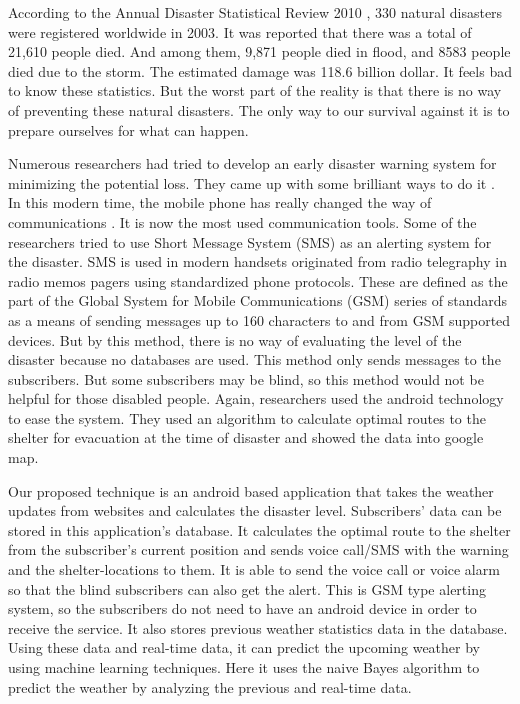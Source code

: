 \documentclass[conference]{IEEEtran}
\begin{document}
    
According to the Annual Disaster Statistical Review 2010 \cite {guha2011annual}, 330 natural disasters were registered worldwide in 2003.  It was reported that there was a total of 21,610 people died. And among them, 9,871 people died in flood, and 8583 people died due to the storm. The estimated damage was 118.6 billion dollar. It feels bad to know these statistics. But the worst part of the reality is that there is no way of preventing these natural disasters. The only way to our survival against it is to prepare ourselves for what can happen.


Numerous researchers had tried to develop an early disaster warning system for minimizing the potential loss. They came up with some brilliant ways to do it \cite{zimmers2015alert,fajardo2010implementation,lo2015developing}. In this modern time, the mobile phone has really changed the way of communications \cite{laird2007mobile,rahman2012location}. It is now the most used communication tools. Some of the researchers tried to use Short Message System (SMS)\cite{mahmud2012sms} as an alerting system for the disaster. SMS is used in modern handsets originated from radio telegraphy \cite{turner2013wireless} in radio memos pagers using standardized phone protocols. These are defined as the part of the Global System for Mobile Communications (GSM) series \cite{waidyanatha2007challenges} of standards as a means of sending messages up to 160 characters to and from GSM supported devices. But by this method, there is no way of evaluating the level of the disaster because no databases are used. This method only sends messages to the subscribers. But some subscribers may be blind, so this method would not be helpful for those disabled people. Again, researchers used the android technology \cite{fajardo2010implementation} to ease the system. They used an algorithm to calculate optimal routes to the shelter for evacuation at the time of disaster and showed the data into google map.

Our proposed technique is an android based application that takes the weather updates from websites and calculates the disaster level. Subscribers’ data can be stored in this application’s database. It calculates the optimal route to the shelter from the subscriber's current position and sends voice call/SMS with the warning and the shelter-locations to them. It is able to send the voice call or voice alarm so that the blind subscribers can also get the alert. This is GSM type alerting system, so the subscribers do not need to have an android device in order to receive the service. It also stores previous weather statistics data in the database. Using these data and real-time data, it can predict the upcoming weather by using machine learning techniques. Here it uses the naive Bayes algorithm \cite{wiki:naive} to predict the weather by analyzing the previous and real-time data.
\end{document}
